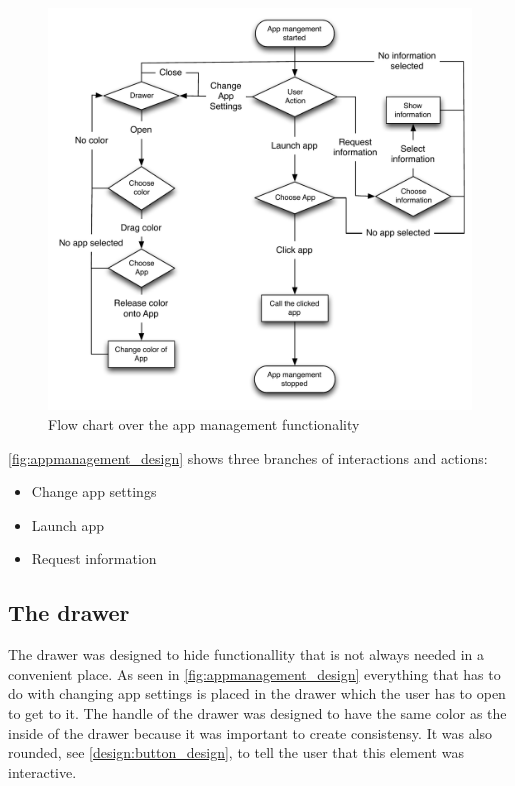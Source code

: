 \begin{figure}[!h]
	\centering
	\includegraphics[width=1\textwidth]{gfx/appmanagement.pdf}
	\caption{Flow chart over the app management functionality}
	\label{fig:appmanagement_design}
\end{figure}

\autoref{fig:appmanagement_design} shows three branches of interactions and actions:

\begin{itemize}
	\item Change app settings
	\item Launch app
	\item Request information
\end{itemize}


\subsection{The drawer}
\label{sec:drawer}
The drawer was designed to hide functionallity that is not always needed in a convenient place. As seen in \autoref{fig:appmanagement_design} everything that has to do with changing app settings is placed in the drawer which the user has to open to get to it.
The handle of the drawer was designed to have the same color as the inside of the drawer because it was important to create consistensy. 
It was also rounded, see \autoref{design:button_design}, to tell the user that this element was interactive.

